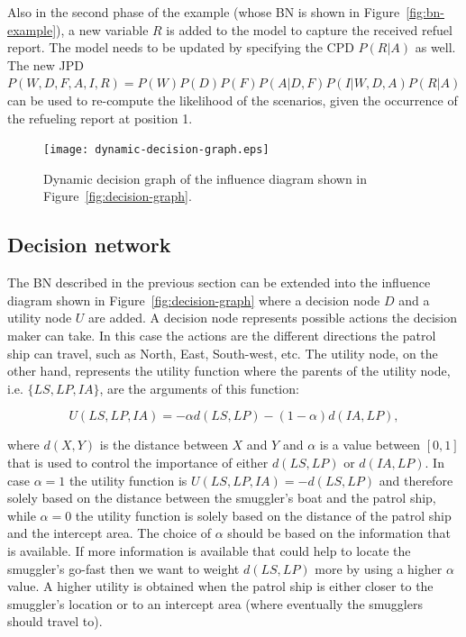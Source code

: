 \documentclass[conference]{IEEEtran}
\begin{document}
Also in the second phase of the example (whose BN is shown in Figure~\ref{fig:bn-example}), a new variable $R$ is added to the model to capture the received refuel report. The model needs to be updated by specifying the CPD $P(R|A)$ as well. The new JPD $P(W,D,F,A,I,R) = P(W)P(D)P(F)P(A|D,F)P(I|W,D,A)P(R|A)$ can be used to re-compute the likelihood of the scenarios, given the occurrence of the refueling report at position 1.


\begin{figure}[!t]
\begin{center}
 \texttt{[image: dynamic-decision-graph.eps]}
 \caption{Dynamic decision graph of the influence diagram shown in Figure~\ref{fig:decision-graph}.}
\end{center}
\end{figure}


\subsection{Decision network}

The BN described in the previous section can be extended into the influence diagram shown in Figure~\ref{fig:decision-graph} where a decision node $D$ and a utility node $U$ are added. A decision node represents possible actions the decision maker can take. In this case the actions are the different directions the patrol ship can travel, such as North, East, South-west, etc. The utility node, on the other hand, represents the utility function where the parents of the utility node, i.e. $\{LS,LP,IA\}$, are the arguments of this function:

\[
 U(LS,LP,IA) = -\alpha d(LS,LP) - (1-\alpha) d(IA,LP),
\]

where $d(X,Y)$ is the distance between $X$ and $Y$ and $\alpha$ is a value between $[0,1]$ that is used to control the importance of either $d(LS,LP)$ or $d(IA,LP)$. In case $\alpha=1$ the utility function is $U(LS,LP,IA) = -d(LS,LP)$ and therefore solely based on the distance between the smuggler's boat and the patrol ship, while $\alpha=0$ the utility function is solely based on the distance of the patrol ship and the intercept area. The choice of $\alpha$ should be based on the information that is available. If more information is available that could help to locate the smuggler's go-fast then we want to weight  $d(LS,LP)$ more by using a higher $\alpha$ value. A higher utility is obtained when the patrol ship is either closer to the smuggler's location or to an intercept area (where eventually the smugglers should travel to).
\end{document}
